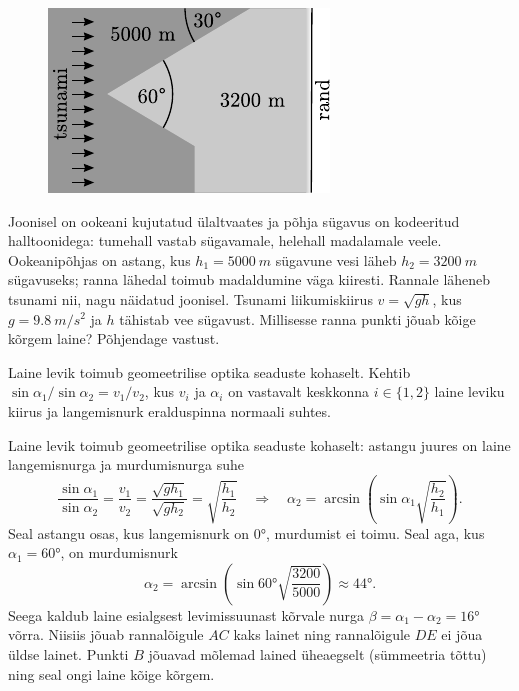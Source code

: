
\begin{figure}
	\begin{center}
		\vspace{-20pt}
		\includegraphics[width=\linewidth]{2005-v3g-06-yl}
	\end{center}
\end{figure}

Joonisel on ookeani kujutatud ülaltvaates ja põhja sügavus on kodeeritud halltoonidega: tumehall vastab sügavamale, helehall madalamale veele. Ookeanipõhjas on astang, kus $h_1 = \SI{5000}{m}$ sügavune vesi läheb $h_2 = \SI{3200}{m}$ sügavuseks; ranna lähedal toimub madaldumine väga kiiresti. Rannale läheneb tsunami nii, nagu näidatud joonisel. Tsunami liikumiskiirus $v = \sqrt{gh}$, kus $g = \SI{9,8}{m/s^2}$ ja $h$ tähistab vee sügavust. Millisesse ranna punkti jõuab kõige kõrgem laine? Põhjendage vastust.

\hint
Laine levik toimub geomeetrilise optika seaduste kohaselt. Kehtib $\sin \alpha_{1}/\sin \alpha_{2}=v_{1}/v_{2}$, kus $v_i$ ja $\alpha_i$ on vastavalt keskkonna $i\in \{1, 2\}$ laine leviku kiirus ja langemisnurk eralduspinna normaali suhtes.

\solu
Laine levik toimub geomeetrilise optika seaduste kohaselt: astangu juures on laine langemisnurga ja murdumisnurga suhe
\[
\frac{\sin \alpha_{1}}{\sin \alpha_{2}}=\frac{v_{1}}{v_{2}}=\frac{\sqrt{g h_{1}}}{\sqrt{g h_{2}}}=\sqrt{\frac{h_{1}}{h_{2}}} \quad\Rightarrow\quad \alpha_{2}=\arcsin \left(\sin \alpha_{1} \sqrt{\frac{h_{2}}{h_{1}}}\right).
\]
Seal astangu osas, kus langemisnurk on \ang{0}, murdumist ei toimu. Seal aga, kus $\alpha_1 = \ang{60}$, on murdumisnurk
\[
\alpha_{2}=\arcsin \left(\sin \ang{60} \sqrt{\frac{3200}{5000}}\right) \approx \ang{44}.
\]
Seega kaldub laine esialgsest levimissuunast kõrvale nurga $\beta = \alpha_1 -\alpha_2 = \ang{16}$ võrra. Niisiis jõuab rannalõigule $AC$ kaks lainet ning rannalõigule $DE$ ei jõua üldse lainet. Punkti $B$ jõuavad mõlemad lained üheaegselt (sümmeetria tõttu) ning seal ongi laine kõige kõrgem.

